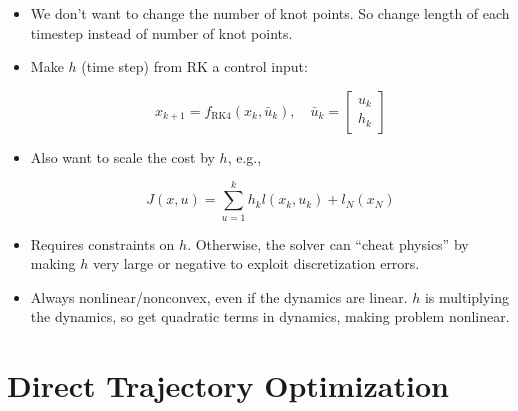 \documentclass[11pt]{article}
\begin{document}
\begin{itemize}
    \item We don't want to change the number of knot points. So change length of each timestep instead of number of knot points.
    \item Make $h$ (time step) from RK a control input:
    
    \begin{equation*}
        x_{k+1} = f_{\text{RK4}}(x_k, \bar{u}_k), \quad \bar{u}_k = \begin{bmatrix} u_k \\ h_k \end{bmatrix}
    \end{equation*}
    
    \item Also want to scale the cost by $h$, e.g.,
    
    \begin{equation*}
        {J}(x, u) = \sum_{u=1}^{k} h_k l(x_k, u_k) + l_N(x_N)
    \end{equation*}
    \item Requires constraints on $h$. Otherwise, the solver can ``cheat physics'' by making $h$ very large or negative to exploit discretization errors.
    \item Always nonlinear/nonconvex, even if the dynamics are linear. $h$ is multiplying the dynamics, so get quadratic terms in dynamics, making problem nonlinear.
\end{itemize}

\section*{Direct Trajectory Optimization}
\end{document}
